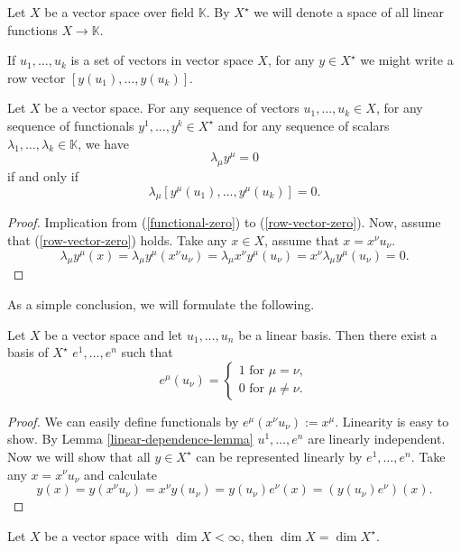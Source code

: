 \documentclass[main.tex]{subfiles}
\begin{document}
\begin{definition}
Let $X$ be a vector space over field $\mathbb{K}$. By $X^\star$ we will denote a space of all linear functions $X\to \mathbb{K}$. 
\end{definition}

If $u_1, \dots, u_k$ is a set of vectors in vector space $X$, for any $y\in X^\star$ we might write a row vector $[y(u_1), \dots, y(u_k)]$.

\begin{lemma}
\label{linear-dependence-lemma}
Let $X$ be a vector space. For any sequence of vectors $u_1, \dots, u_k\in X$, for any sequence of  functionals $y^1, \dots, y^k\in X^\star$ and for any sequence of scalars $\lambda_1, \dots, \lambda_k\in \mathbb{K}$, we have
\begin{equation}
\label{functional-zero}
\lambda_\mu y^\mu = 0
\end{equation}
if and only if
\begin{equation}
\label{row-vector-zero}
\lambda_\mu [y^\mu(u_1), \dots, y^\mu(u_k)] = 0.
\end{equation}
\end{lemma}
\begin{proof}
Implication from (\ref{functional-zero}) to (\ref{row-vector-zero}). Now, assume that (\ref{row-vector-zero}) holds. Take any $x\in X$, assume that $x = x^\nu u_\nu$.
\begin{equation}
\lambda_\mu y^\mu(x) = \lambda_\mu y^\mu(x^\nu u_\nu) = \lambda_\mu x^\nu y^\mu(u_\nu) = x^\nu \lambda_\mu  y^\mu(u_\nu) = 0.
\end{equation}
\end{proof}
As a simple conclusion, we will formulate the following.
\begin{theorem}
Let $X$ be a vector space and let $u_1, \dots, u_n$ be a linear basis. Then there exist a basis of $X^\star$ $e^1, \dots, e^n$ such that
\begin{equation}
e^\mu(u_\nu) = 
\begin{cases}
1 \text{ for } \mu = \nu, \\
0 \text{ for } \mu \not= \nu.
\end{cases}
\end{equation}
\end{theorem}
\begin{proof}
We can easily define functionals by $e^\mu(x^\nu u_\nu) := x^\mu$. Linearity is easy to show. By Lemma \ref{linear-dependence-lemma} $u^1, \dots, e^n$ are linearly independent. Now we will show that all $y\in X^\star$ can be represented linearly by $e^1, \dots, e^n$. Take any $x=x^\nu u_\nu$ and calculate
\begin{equation}
y(x) = y(x^\nu u_\nu) = x^\nu y(u_\nu) = y(u_\nu) e^\nu(x) = (y(u_\nu) e^\nu)(x).  
\end{equation}
\end{proof}
\begin{corollary}
Let $X$ be a vector space with $\dim X < \infty$, then $\dim X = \dim X^\star$.
\end{corollary}
\end{document}

